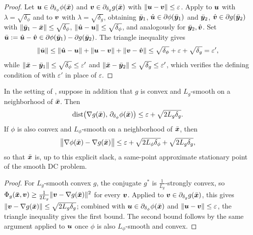\begin{proof}
Let $\bm{u}\in\partial_{\delta_\phi}\phi(\bar{\bm{x}})$ and
$\bm{v}\in\partial_{\delta_g}g(\bar{\bm{x}})$ with $\|\bm{u}-\bm{v}\|\le\varepsilon$.
Apply  to $\bm{u}$ with $\lambda=\sqrt{\delta_\phi}$
and to $\bm{v}$ with $\lambda=\sqrt{\delta_g}$, obtaining $\bar{\bm{y}}_1$,
$\hat{\bm{u}}\in\partial\phi(\bar{\bm{y}}_1)$ and $\bar{\bm{y}}_2$,
$\hat{\bm{v}}\in\partial g(\bar{\bm{y}}_2)$ with $\|\bar{\bm{y}}_1-\bar{\bm{x}}\|\le\sqrt{\delta_\phi}$,
$\|\hat{\bm{u}}-\bm{u}\|\le\sqrt{\delta_\phi}$, and analogously for
$\bar{\bm{y}}_2,\hat{\bm{v}}$. Set $\bar{\bm{u}}:=\hat{\bm{u}}-\hat{\bm{v}}\in\partial\phi(\bar{\bm{y}}_1)-\partial g(\bar{\bm{y}}_2)$. The triangle inequality gives
\[
    \|\bar{\bm{u}}\|
    \le\|\hat{\bm{u}}-\bm{u}\|+\|\bm{u}-\bm{v}\|+\|\bm{v}-\hat{\bm{v}}\|
    \le\sqrt{\delta_\phi}+\varepsilon+\sqrt{\delta_g}=\varepsilon',
\]
while $\|\bar{\bm{x}}-\bar{\bm{y}}_1\|\le\sqrt{\delta_\phi}\le\varepsilon'$ and
$\|\bar{\bm{x}}-\bar{\bm{y}}_2\|\le\sqrt{\delta_g}\le\varepsilon'$, which verifies the
defining condition of  with
$\varepsilon'$ in place of $\varepsilon$.
\end{proof}

\begin{proposition}
\label{prop:reverse-smooth}
In the setting of , suppose in addition that
$g$ is convex and $L_g$-smooth on a neighborhood of $\bar{\bm{x}}$. Then
\[
    \operatorname{dist}\bigl(\nabla g(\bar{\bm{x}}),\,\partial_{\delta_\phi}\phi(\bar{\bm{x}})\bigr)
    \le\varepsilon+\sqrt{2L_g\delta_g}.
\]
If $\phi$ is also convex and $L_\phi$-smooth on a neighborhood of
$\bar{\bm{x}}$, then
\[
    \bigl\|\nabla\phi(\bar{\bm{x}})-\nabla g(\bar{\bm{x}})\bigr\|
    \le\varepsilon+\sqrt{2L_\phi\delta_\phi}+\sqrt{2L_g\delta_g},
\]
so that $\bar{\bm{x}}$ is, up to this explicit slack, a same-point approximate
stationary point of the smooth DC problem.
\end{proposition}

\begin{proof}
For $L_g$-smooth convex $g$, the conjugate $g^*$ is
$\tfrac1{L_g}$-strongly convex, so $\Phi_g(\bar{\bm{x}},\bm{v})\ge
\tfrac1{2L_g}\|\bm{v}-\nabla g(\bar{\bm{x}})\|^2$ for every $\bm{v}$. Applied to
$\bm{v}\in\partial_{\delta_g}g(\bar{\bm{x}})$, this gives
$\|\bm{v}-\nabla g(\bar{\bm{x}})\|\le\sqrt{2L_g\delta_g}$; combined with
$\bm{u}\in\partial_{\delta_\phi}\phi(\bar{\bm{x}})$ and $\|\bm{u}-\bm{v}\|\le\varepsilon$,
the triangle inequality gives the first bound. The second bound follows by
the same argument applied to $\bm{u}$ once $\phi$ is also $L_\phi$-smooth and
convex.
\end{proof}

